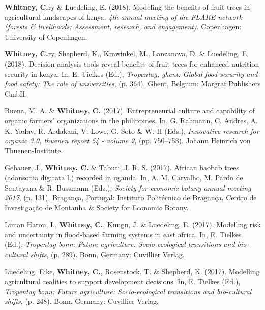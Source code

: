 \documentclass[11pt,a4paper,]{awesome-cv}
\newlength{\cslhangindent}
\newenvironment{CSLReferences}[2] %
 {\begin{list}{}{%
  \setlength{\itemindent}{0pt}
  \setlength{\leftmargin}{0pt}
  \setlength{\parsep}{0pt}
  \ifodd #1
   \setlength{\leftmargin}{\cslhangindent}
   \setlength{\itemindent}{-1\cslhangindent}
  \fi
  \setlength{\itemsep}{#2\baselineskip}}}
 {\end{list}}
\begin{document}
\begin{CSLReferences}{1}{0}
\textbf{Whitney, C.}ry \& Luedeling, E. (2018). Modeling the benefits of
fruit trees in agricultural landscapes of kenya. \emph{4th annual
meeting of the FLARE network (forests \& livelihoods: Assessment,
research, and engagement)}. Copenhagen: University of Copenhagen.

\textbf{Whitney, C.}ry, Shepherd, K., Krawinkel, M., Lanzanova, D. \&
Luedeling, E. (2018). Decision analysis tools reveal benefits of fruit
trees for enhanced nutrition security in kenya. In, E. Tielkes (Ed.),
\emph{Tropentag, ghent: Global food security and food safety: The role
of universities}, (p. 364). Ghent, Belgium: Margraf Publishers GmbH.

Buena, M. A. \& \textbf{Whitney, C.} (2017). Entrepreneurial culture and
capability of organic farmers' organizations in the philippines. In, G.
Rahmann, C. Andres, A. K. Yadav, R. Ardakani, V. Lowe, G. Soto \& W. H
(Eds.), \emph{Innovative research for organic 3.0, thuenen report 54 -
volume 2}, (pp. 750--753). Johann Heinrich von Thuenen-Institute.

Gebauer, J., \textbf{Whitney, C.} \& Tabuti, J. R. S. (2017). African
baobab trees (adansonia digitata l.) recorded in uganda. In, A. M.
Carvalho, M. Pardo de Santayana \& R. Bussmann (Eds.), \emph{Society for
economic botany annual meeting 2017}, (p. 131). Bragança, Portugal:
Instituto Politécnico de Bragança, Centro de Investigação de Montanha \&
Society for Economic Botany.

Liman Harou, I., \textbf{Whitney, C.}, Kungu, J. \& Luedeling, E.
(2017). Modelling risk and uncertainty in flood-based farming systems in
east africa. In, E. Tielkes (Ed.), \emph{Tropentag bonn: Future
agriculture: Socio-ecological transitions and bio-cultural shifts}, (p.
289). Bonn, Germany: Cuvillier Verlag.

Luedeling, Eike, \textbf{Whitney, C.}, Rosenstock, T. \& Shepherd, K.
(2017). Modelling agricultural realities to support development
decisions. In, E. Tielkes (Ed.), \emph{Tropentag bonn: Future
agriculture: Socio-ecological transitions and bio-cultural shifts}, (p.
248). Bonn, Germany: Cuvillier Verlag.


\end{CSLReferences}
\end{document}
